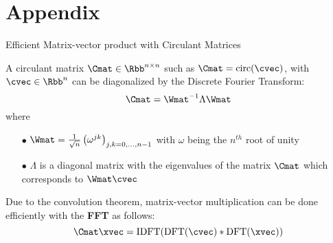 \section{Appendix}



\begin{frame}{Efficient Matrix-vector product with Circulant Matrices}

  A circulant matrix $\Cmat \in \Rbb^{n \times n}$ such as $\Cmat = \circulant (\cvec)$, with $\cvec \in \Rbb^n$ can be diagonalized by the Discrete Fourier Transform:
  \begin{equation*}
      \Cmat = \Wmat^{-1} \Lambda \Wmat
  \end{equation*}
  where 
  \begin{itemize}
    \item[$\bullet$] $\Wmat = \frac{1}{\sqrt{n}} \left( \omega^{jk} \right)_{j,k = 0, \dots, n-1}$ with $\omega$ being the $n^{th}$ root of unity
    \item[$\bullet$] $\Lambda$ is a diagonal matrix with the eigenvalues of the matrix $\Cmat$ which corresponds to $\Wmat \cvec$
  \end{itemize}

  Due to the convolution theorem, matrix-vector multiplication can be done efficiently with the \textbf{FFT} as follows:
  \begin{equation*}
    \Cmat \xvec = \mathrm{IDFT}( \mathrm{DFT}(\cvec) * \mathrm{DFT}(\xvec) )
  \end{equation*}

\end{frame}



